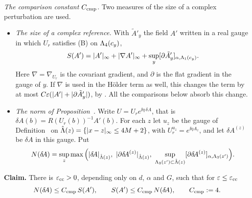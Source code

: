 \begin{detail}\label{xa:d-cmp}
\emph{The comparison constant $C_{\rm cmp}$.} Two measures of the size of a complex perturbation are used.
\begin{itemize}
\item \emph{The size of a complex reference.} With $\tilde A'_y$ the field $A'$ written in a real gauge in which $U_r$ satisfies (B) on $\Lambda_4(c_y)$,
\[
S(A')=\lvert A'\rvert_\infty+\lvert\nabla A'\rvert_\infty+\sup_y[\partial\tilde A'_y]_{\alpha,\Lambda_1(c_y)} .
\]
Here $\nabla=\nabla_{U_r}$ is the covariant gradient, and $\partial$ is the flat gradient in the gauge of $y$. If $\nabla$ is used in the H\"older term as well, this changes the term by at most $C\varepsilon(\lvert A'\rvert+\lvert\partial\tilde A'_y\rvert)$, by . All the comparisons below absorb this change.
\item \emph{The norm of Proposition~.} Write $U=U_r e^{\ii\eta\,\delta\!A}$, that is $\delta\!A(b)=R(U_r(b))^{-1}A'(b)$. For each $z$ let $u_z$ be the gauge of Definition~ on $\hat{\Lambda}(z)=\{\lvert x-z\rvert_\infty\le4M+2\}$, with $U_r^{u_z}=e^{\ii\eta A_z}$, and let $\delta\!A^{(z)}$ be $\delta\!A$ in this gauge. Put
\[
N(\delta\!A)=\sup_z\max\Big(\xaabs{\delta\!A}_{\hat\Lam(z)},\ \xaabs{\partial\delta\!A^{(z)}}_{\hat\Lam(z)},\ \sup_{\Lam_3(z')\subset\hat\Lam(z)}\Hol{\partial\delta\!A^{(z)}}{\Lam_3(z')}\Big).
\]
\end{itemize}

\textbf{Claim.} There is $\varepsilon_{\rm cc}>0$, depending only on $d$, $\alpha$ and $G$, such that for $\varepsilon\le\varepsilon_{\rm cc}$
\[
N(\delta\!A)\le C_{\rm cmp}\,S(A'),\qquad S(A')\le C_{\rm cmp}\,N(\delta\!A),\qquad C_{\rm cmp}:=4 .
\]


\end{detail}
